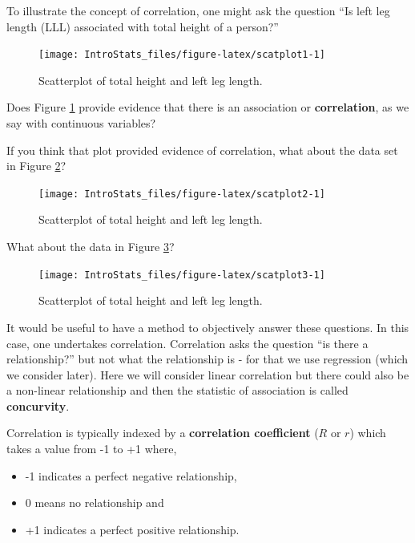 \documentclass[
  oneside]{krantz}
\providecommand{\tightlist}{%
  \setlength{\itemsep}{0pt}\setlength{\parskip}{0pt}}
\begin{document}
To illustrate the concept of correlation, one might ask the question ``Is left leg length (LLL) associated with total height of a person?''

\begin{figure}

{\centering \texttt{[image: IntroStats\_files/figure-latex/scatplot1-1]} 

}

\caption{Scatterplot of total height and left leg length.}\label{fig:scatplot1}
\end{figure}

Does Figure \ref{fig:scatplot1} provide evidence that there is an association or \textbf{correlation}, as we say with continuous variables?

If you think that plot provided evidence of correlation, what about the data set in Figure \ref{fig:scatplot2}?

\begin{figure}

{\centering \texttt{[image: IntroStats\_files/figure-latex/scatplot2-1]} 

}

\caption{Scatterplot of total height and left leg length.}\label{fig:scatplot2}
\end{figure}

What about the data in Figure \ref{fig:scatplot3}?

\begin{figure}

{\centering \texttt{[image: IntroStats\_files/figure-latex/scatplot3-1]} 

}

\caption{Scatterplot of total height and left leg length.}\label{fig:scatplot3}
\end{figure}

It would be useful to have a method to objectively answer these questions. In this case, one undertakes correlation. Correlation asks the question ``is there a relationship?'' but not what the relationship is - for that we use regression (which we consider later). Here we will consider linear correlation but there could also be a non-linear relationship and then the statistic of association is called \textbf{concurvity}.

Correlation is typically indexed by a \textbf{correlation coefficient} (\(R\) or \(r\)) which takes a value from -1 to +1 where,

\begin{itemize}
\tightlist
\item
  -1 indicates a perfect negative relationship,
\item
  0 means no relationship and
\item
  +1 indicates a perfect positive relationship.
\end{itemize}
\end{document}
